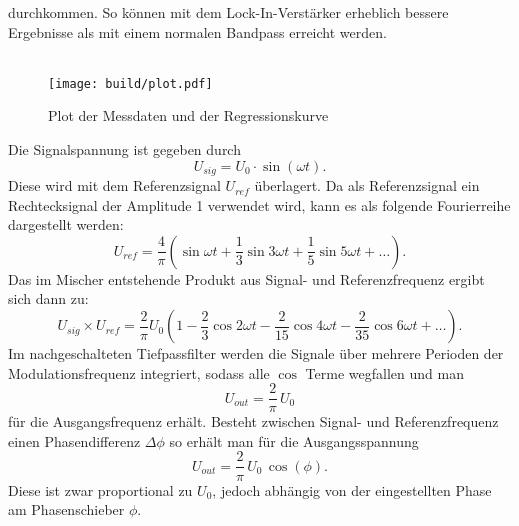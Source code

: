 durchkommen. So können mit dem Lock-In-Verstärker erheblich bessere Ergebnisse als mit einem normalen Bandpass erreicht werden.\\
\\
\begin{figure}[H]
    \centering
    \texttt{[image: build/plot.pdf]}
    \caption{Plot der Messdaten und der Regressionskurve\protect\footnotemark}
    \label{fig:abb1}
\end{figure}
Die Signalspannung ist gegeben durch
\begin{equation}
    U_{sig} = U_0 \cdot \sin(\omega t).
\end{equation}
Diese wird mit dem Referenzsignal $U_{ref}$ überlagert. Da als Referenzsignal ein Rechtecksignal der Amplitude 1 verwendet wird, kann es als folgende Fourierreihe
dargestellt werden:
\begin{equation}\label{eqn:referenzFrequenz}
    U_{ref} = \frac{4}{\pi}\left(\sin{ωt} + \frac{1}{3}\sin{3ωt} + \frac{1}{5}\sin{5ωt} + \ldots\right).
\end{equation}
\newpage
Das im Mischer entstehende Produkt aus Signal- und Referenzfrequenz ergibt sich dann zu:
\begin{equation}\label{eqn:produkt}
    U_{sig} \times U_{ref} = \frac{2}{π}U_0\left( 1 - \frac{2}{3}\cos{2ωt} - \frac{2}{15}\cos{4ωt} - \frac{2}{35}\cos{6ωt} + \ldots\right).
\end{equation}
Im nachgeschalteten Tiefpassfilter werden die Signale über mehrere Perioden der Modulationsfrequenz integriert, sodass alle $\cos$ Terme wegfallen und man
\begin{equation}
    U_{out} = \frac{2}{\pi}\,U_0
\end{equation}
für die Ausgangsfrequenz erhält. Besteht zwischen Signal- und Referenzfrequenz einen Phasendifferenz $\Delta \phi$ so erhält man für die Ausgangsspannung
\begin{equation}
    U_{out} = \frac{2}{\pi}\,U_0\,\cos(\phi).
\end{equation}
Diese ist zwar proportional zu $U_0$, jedoch abhängig von der eingestellten Phase am Phasenschieber $\phi$.